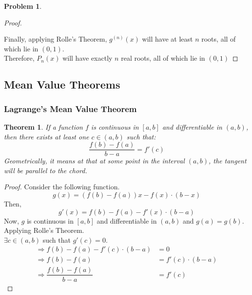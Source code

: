 \documentclass[14]{article}
\newtheorem{theorem}{Theorem}
\theoremstyle{definition}
\newtheorem{prob}{Problem}
\begin{document}
\begin{prob}
\begin{proof}
\begin{figure}[h]
\end{figure}
Finally, applying Rolle's Theorem, $g^{(n)}(x)$ will have at least $n$ roots, all of which lie in $(0, 1)$.\\
Therefore, $P_n(x)$ will have exactly $n$ real roots, all of which lie in $(0, 1)$
\end{proof}
\end{prob}
\pagebreak
\subsection{Mean Value Theorems}
\subsubsection{Lagrange's Mean Value Theorem}
\begin{theorem}
If a function $f$ is continuous in $[a, b]$ and differentiable in $(a, b)$, then there exists at least one $c \in (a, b)$ such that:
\[\dfrac{f(b) - f(a)}{b - a} = f'(c)\]
Geometrically, it means at that at some point in the interval $(a, b)$, the tangent will be parallel to the chord.
\end{theorem}
\begin{proof}
Consider the following function.
\[g(x) = \left( f(b) - f(a) \right)x - f(x)\cdot (b - x)\]
Then,
\[g'(x) = f(b) - f(a) - f'(x) \cdot (b - a)\]
Now, $g$ is continuous in $[a, b]$ and differentiable in $(a, b)$ and $g(a) = g(b)$. Applying Rolle's Theorem.\\
$\exists c \in (a, b)$ such that $g'(c) = 0$.\\
\begin{align*}
\Rightarrow f(b) - f(a) - f'(c) \cdot (b - a) &= 0\\
\Rightarrow f(b) - f(a) &= f'(c) \cdot (b - a)\\
\Rightarrow \dfrac{f(b) - f(a)}{b - a} &= f'(c)
\end{align*}
\end{proof}
\end{document}
